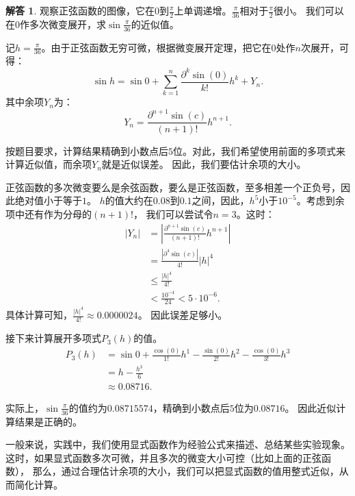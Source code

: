 \documentclass[12pt,UTF8]{ctexbook}
\theoremstyle{definition}
\newtheorem*{so}{解答}
\theoremstyle{plain}
\begin{document}
\begin{so}
    观察正弦函数的图像，它在$0$到$\frac{\pi}{2}$上单调递增。$\frac{\pi}{36}$相对于$\frac{\pi}{2}$很小。
    我们可以在$0$作多次微变展开，求$\sin{\frac{\pi}{36}}$的近似值。

    记$h = \frac{\pi}{36}$。由于正弦函数无穷可微，根据微变展开定理，把它在$0$处作$n$次展开，可得：
    $$ \sin{h} = \sin{0} + \sum_{k=1}^n \frac{\partial^k \sin (0)}{k!}h^k + Y_n. $$
    其中余项$Y_n$为：
    $$ Y_n = \frac{\partial^{n+1} \sin (c)}{(n+1)!}h^{n+1}. $$

    按题目要求，计算结果精确到小数点后$5$位。对此，我们希望使用前面的多项式来计算近似值，而余项$Y_n$就是近似误差。
    因此，我们要估计余项的大小。
    
    正弦函数的多次微变要么是余弦函数，要么是正弦函数，至多相差一个正负号，因此绝对值小于等于$1$。
    $h$的值大约在$0.08$到$0.1$之间，因此，$h^5$小于$10^{-5}$。考虑到余项中还有作为分母的$(n+1)!$，
    我们可以尝试令$n=3$。这时：
    \begin{align*}
        | Y_n| &= \left|\frac{\partial^{n+1} \sin (c)}{(n+1)!}h^{n+1}\right|  \\
        &= \frac{\left|\partial^{4} \sin (c)\right|}{4!}|h|^4  \\
        &\leqslant \frac{|h|^4}{4!}  \\
        &< \frac{10^{-4}}{24} < 5 \cdot 10^{-6}. 
    \end{align*}
    具体计算可知，$\frac{|h|^4}{4!} \approx 0.0000024$。
    因此误差足够小。


    接下来计算展开多项式$P_3(h)$的值。
    \begin{align*}
        P_3(h) &= \sin{0} + \frac{\cos (0)}{1!}h^1 - \frac{\sin (0)}{2!}h^2 - \frac{\cos (0)}{3!}h^3  \\
        &= h - \frac{h^3}{6}  \\
        &\approx 0.08716. 
    \end{align*}
    
    实际上，$\sin{\frac{\pi}{36}}$的值约为$0.08715574$，精确到小数点后$5$位为$0.08716$。
    因此近似计算结果是正确的。
\end{so}

一般来说，实践中，我们使用显式函数作为经验公式来描述、总结某些实验现象。
这时，如果显式函数多次可微，并且多次的微变大小可控（比如上面的正弦函数），
那么，通过合理估计余项的大小，我们可以把显式函数的值用整式近似，从而简化计算。
\end{document}
